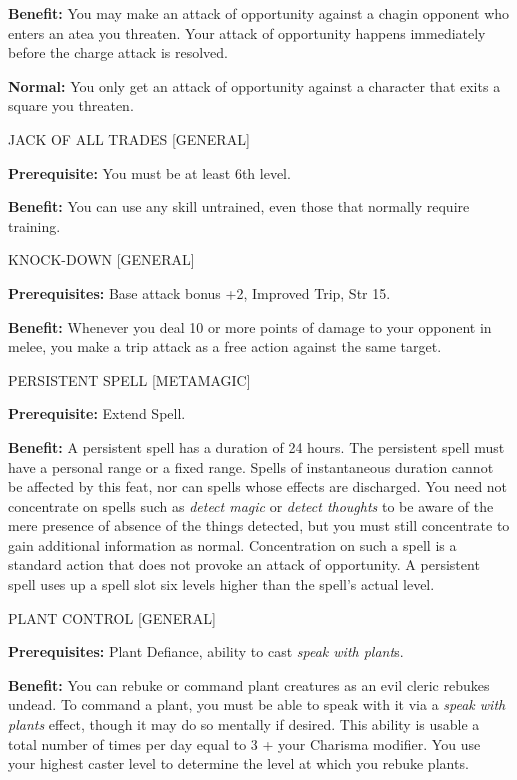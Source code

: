 \documentclass{article}
\begin{document}
\textbf{Benefit:} You may make an attack of opportunity against a chagin opponent 
who enters an atea you threaten.  Your attack of opportunity happens immediately 
before the charge attack is resolved.

\textbf{Normal:} You only get an attack of opportunity against a character that 
exits a square you threaten.

\vspace{12pt}
JACK OF ALL TRADES [GENERAL]

\textbf{Prerequisite:} You must be at least 6th level.

\textbf{Benefit:} You can use any skill untrained, even those that normally require 
training.

\vspace{12pt}
KNOCK-DOWN [GENERAL]

\textbf{Prerequisites:} Base attack bonus +2, Improved Trip, Str 15.

\textbf{Benefit:} Whenever you deal 10 or more points of damage to your opponent 
in melee, you make a trip attack as a free action against the same target.

\vspace{12pt}
PERSISTENT SPELL [METAMAGIC]

\textbf{Prerequisite:} Extend Spell.

\textbf{Benefit:} A persistent spell has a duration of 24 hours. The persistent 
spell must have a personal range or a fixed range. Spells of instantaneous duration 
cannot be affected by this feat, nor can spells whose effects are discharged.  
You need not concentrate on spells such as \textit{detect magic} or\textit{ detect 
thoughts} to be aware of the mere presence of absence of the things detected, but 
you must still concentrate to gain additional information as normal.  Concentration 
on such a spell is a standard action that does not provoke an attack of opportunity. 
 A persistent spell uses up a spell slot six levels higher than the spell's actual 
level.

\vspace{12pt}
PLANT CONTROL [GENERAL]

\textbf{Prerequisites:} Plant Defiance, ability to cast \textit{speak with plant}s.

\textbf{Benefit:} You can rebuke or command plant creatures as an evil cleric rebukes 
undead. To command a plant, you must be able to speak with it via a \textit{speak 
with plants }effect, though it may do so mentally if desired. This ability is usable 
a total number of times per day equal to 3 + your Charisma modifier. You use your 
highest caster level to determine the level at which you rebuke plants.
\end{document}
